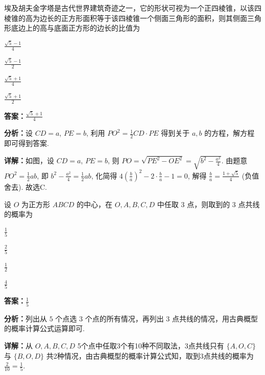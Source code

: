 \begin{question}[points=5]
埃及胡夫金字塔是古代世界建筑奇迹之一，它的形状可视为一个正四棱锥，以该四棱锥的高为边长的正方形面积等于该四棱锥一个侧面三角形的面积，则其侧面三角形底边上的高与底面正方形的边长的比值为
\begin{choices}
  \item $\frac{\sqrt{5} - 1}{4}$
  \item $\frac{\sqrt{5} - 1}{2}$
  \item $\frac{\sqrt{5} + 1}{4}$
  \item $\frac{\sqrt{5} + 1}{2}$
\end{choices}
\begin{solution}
\textbf{答案：}$\frac{\sqrt{5} + 1}{4}$

\textbf{分析：}设 $CD = a$, $PE = b$, 利用 $PO^2 = \frac{1}{2} CD \cdot PE$ 得到关于 $a, b$ 的方程，解方程即可得到答案.

\textbf{详解：}如图，设 $CD = a$, $PE = b$, 则 $PO = \sqrt{PE^2 - OE^2} = \sqrt{b^2 - \frac{a^2}{4}}$. 由题意 $PO^2 = \frac{1}{2} ab$, 即 $b^2 - \frac{a^2}{4} = \frac{1}{2} ab$, 化简得 $4\left(\frac{b}{a}\right)^2 - 2\cdot \frac{b}{a} - 1 = 0$, 解得 $\frac{b}{a} = \frac{1+\sqrt{5}}{4}$ (负值舍去). 故选C.
\end{solution}
\end{question}

\begin{question}[points=5]
设 $O$ 为正方形 $ABCD$ 的中心，在 $O, A, B, C, D$ 中任取 $3$ 点，则取到的 $3$ 点共线的概率为
\begin{choices}
  \item $\frac{1}{5}$
  \item $\frac{2}{5}$
  \item $\frac{1}{2}$
  \item $\frac{4}{5}$
\end{choices}
\begin{solution}
\textbf{答案：}$\frac{1}{5}$

\textbf{分析：}列出从 $5$ 个点选 $3$ 个点的所有情况，再列出 $3$ 点共线的情况，用古典概型的概率计算公式运算即可.

\textbf{详解：}从 $O,A,B,C,D$ 5个点中任取3个有10种不同取法，3点共线只有 $\{A,O,C\}$ 与 $\{B,O,D\}$ 共2种情况，由古典概型的概率计算公式知，取到3点共线的概率为 $\frac{2}{10} = \frac{1}{5}$.
\end{solution}
\end{question}

